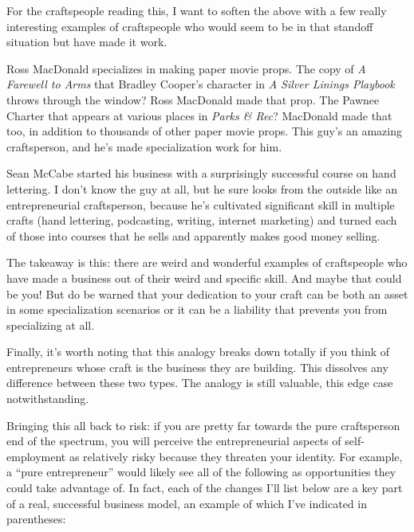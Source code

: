 For the craftspeople reading this, I want to soften the above with a few really interesting examples of craftspeople who would seem to be in that standoff situation but have made it work.

Ross MacDonald specializes in making paper movie props. The copy of \emph{A Farewell to Arms} that Bradley Cooper's character in \emph{A Silver Linings Playbook} throws through the window? Ross MacDonald made that prop. The Pawnee Charter that appears at various places in \emph{Parks \& Rec}? MacDonald made that too, in addition to thousands of other paper movie props. This guy's an amazing craftsperson, and he's made specialization work for him.

Sean McCabe started his business with a surprisingly successful course on hand lettering. I don't know the guy at all, but he sure looks from the outside like an entrepreneurial craftsperson, because he's cultivated significant skill in multiple crafts (hand lettering, podcasting, writing, internet marketing) and turned each of those into courses that he sells and apparently makes good money selling.

The takeaway is this: there are weird and wonderful examples of craftspeople who have made a business out of their weird and specific skill. And maybe that could be you! But do be warned that your dedication to your craft can be both an asset in some specialization scenarios or it can be a liability that prevents you from specializing at all.

Finally, it’s worth noting that this analogy breaks down totally if you think of entrepreneurs whose craft is the business they are building. This dissolves any difference between these two types. The analogy is still valuable, this edge case notwithstanding.

Bringing this all back to risk: if you are pretty far towards the pure craftsperson end of the spectrum, you will perceive the entrepreneurial aspects of self-employment as relatively risky because they threaten your identity. For example, a ``pure entrepreneur'' would likely see all of the following as opportunities they could take advantage of. In fact, each of the changes I'll list below are a key part of a real, successful business model, an example of which I've indicated in parentheses:

